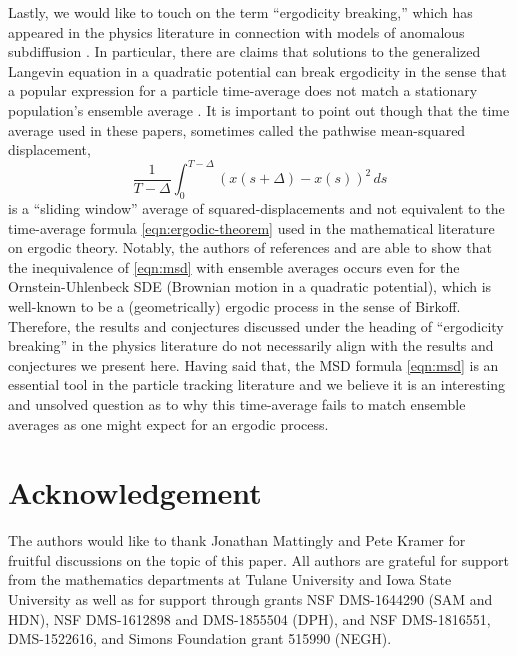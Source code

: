 \documentclass[11pt]{amsart}
\theoremstyle{definition}
\theoremstyle{definition}
\theoremstyle{plain}
\numberwithin{equation}{section}
\begin{document}
Lastly, we would like to touch on the term ``ergodicity breaking,'' which has appeared in the physics literature in connection with models of anomalous subdiffusion \cite{he2008random,lubelski2008nonergodicity}. In particular, there are claims that solutions to the generalized Langevin equation in a quadratic potential  can break ergodicity in the sense that a popular expression for a particle time-average does not match a stationary population's ensemble average \cite{jeon2010fractional, jeon2012inequivalence}. It is important to point out though that the time average used in these papers, sometimes called the pathwise mean-squared displacement,
\begin{equation} \label{eqn:msd}
\frac{1}{T-\Delta}\int_0^{T-\Delta} (x(s+ \Delta)- x(s))^2 \, ds
\end{equation}
is a ``sliding window'' average of squared-displacements and not equivalent to the time-average formula \eqref{eqn:ergodic-theorem} used in the mathematical literature on ergodic theory. Notably, the authors of references \cite{jeon2010fractional} and \cite{jeon2012inequivalence} are able to show that the inequivalence of \eqref{eqn:msd} with ensemble averages occurs even for the Ornstein-Uhlenbeck SDE (Brownian motion in a quadratic potential), which is well-known to be a (geometrically) ergodic process in the sense of Birkoff. Therefore, the results and conjectures discussed under the heading of ``ergodicity breaking'' in the physics literature do not necessarily align with the results and conjectures we present here. Having said that, the MSD formula \eqref{eqn:msd} is an essential tool in the particle tracking literature and we believe it is an interesting and unsolved question as to why this time-average fails to match ensemble averages as one might expect for an ergodic process.



\section*{Acknowledgement}The authors would like to thank Jonathan Mattingly and Pete Kramer for fruitful discussions on the topic of this paper.  All authors are grateful for support from the mathematics departments at Tulane University and Iowa State University as well as for support through grants NSF DMS-1644290 (SAM and HDN), NSF DMS-1612898 and DMS-1855504 (DPH), and NSF DMS-1816551, DMS-1522616, and Simons Foundation grant 515990 (NEGH).     
\end{document}
